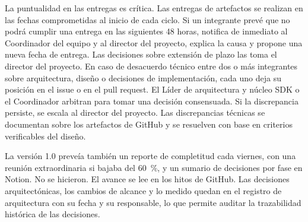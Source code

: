 La puntualidad en las entregas es crítica. Las entregas de artefactos se realizan en las fechas comprometidas al inicio de cada ciclo. Si un integrante prevé que no podrá cumplir una entrega en las siguientes 48 horas, notifica de inmediato al Coordinador del equipo y al director del proyecto, explica la causa y propone una nueva fecha de entrega. Las decisiones sobre extensión de plazo las toma el director del proyecto. En caso de desacuerdo técnico entre dos o más integrantes sobre arquitectura, diseño o decisiones de implementación, cada uno deja su posición en el issue o en el pull request. El Líder de arquitectura y núcleo SDK o el Coordinador arbitran para tomar una decisión consensuada. Si la discrepancia persiste, se escala al director del proyecto. Las discrepancias técnicas se documentan sobre los artefactos de GitHub y se resuelven con base en criterios verificables del diseño.

La versión 1.0 preveía también un reporte de completitud cada viernes, con una reunión extraordinaria si bajaba del 60~\%, y un sumario de decisiones por fase en Notion. No se hicieron. El avance se lee en los hitos de GitHub. Las decisiones arquitectónicas, los cambios de alcance y lo medido quedan en el registro de arquitectura con su fecha y su responsable, lo que permite auditar la trazabilidad histórica de las decisiones.
